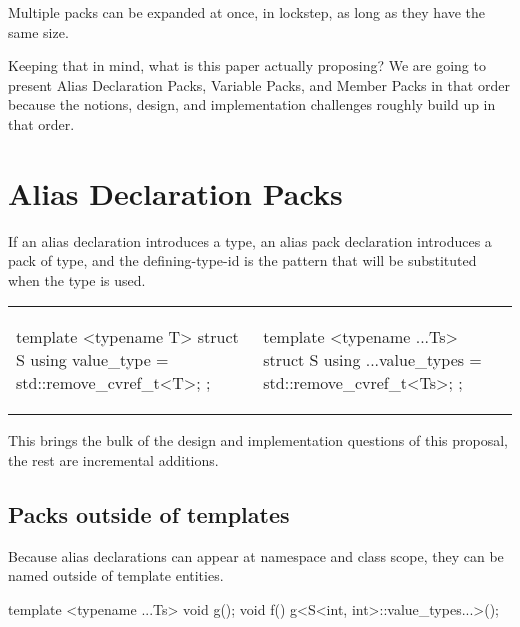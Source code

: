 \documentclass{wg21}
\begin{document}
Multiple packs can be expanded at once, in lockstep, as long as they have the same size.

Keeping that in mind, what is this paper actually proposing?
We are going to present Alias Declaration Packs, Variable Packs, and Member Packs in that order because the notions, design, and implementation challenges roughly build up in that order.

\pagebreak
\section{Alias Declaration Packs}
If an alias declaration introduces a type, an alias pack declaration introduces a pack of type, and the defining-type-id is the pattern that will be substituted when the type is used.

\begin{center}
\begin{tabular}{l|l}
\begin{minipage}[t]{0.5\textwidth}
\begin{colorblock}
template <typename T>
struct S{
    using value_type = std::remove_cvref_t<T>;
};
\end{colorblock}
\end{minipage}
&
\begin{minipage}[t]{0.5\textwidth}
\begin{colorblock}
template <typename ...Ts>
struct S{
    using ...value_types = std::remove_cvref_t<Ts>;
};
\end{colorblock}
\end{minipage}
\\
\end{tabular}
\end{center}

This brings the bulk of the design and implementation questions of this proposal, the rest are incremental additions.

\subsection{Packs outside of templates}

Because alias declarations can appear at namespace and class scope, they can be named outside of template entities.

\begin{colorblock}
template <typename ...Ts>
void g();
void f() {
    g<S<int, int>::value_types...>();
}
\end{colorblock}
\end{document}
